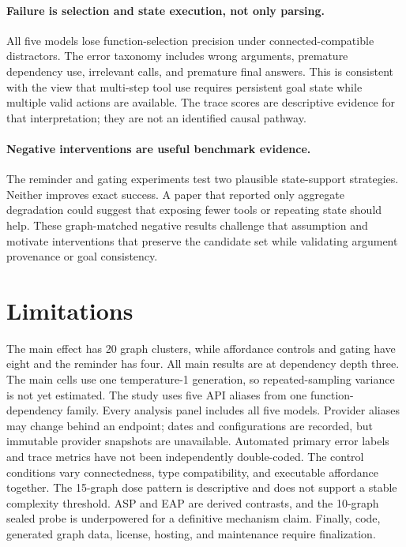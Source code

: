 \documentclass[twoside,11pt,preprint]{article}
\begin{document}
\paragraph{Failure is selection and state execution, not only parsing.}
All five models lose function-selection precision under connected-compatible
distractors. The error taxonomy includes wrong arguments, premature dependency
use, irrelevant calls, and premature final answers. This is consistent with the
view that multi-step tool use requires persistent goal state while multiple
valid actions are available. The trace scores are descriptive evidence for that
interpretation; they are not an identified causal pathway.

\paragraph{Negative interventions are useful benchmark evidence.}
The reminder and gating experiments test two plausible state-support strategies.
Neither improves exact success. A paper that reported only aggregate degradation
could suggest that exposing fewer tools or repeating state should help. These
graph-matched negative results challenge that assumption and motivate
interventions that preserve the candidate set while validating argument
provenance or goal consistency.

\section{Limitations}

The main effect has 20 graph clusters, while affordance controls and gating have
eight and the reminder has four. All main results are at dependency depth three.
The main cells use one temperature-1 generation, so repeated-sampling variance is
not yet estimated. The study uses five API aliases from one function-dependency
family. Every analysis panel includes all five models. Provider aliases may
change behind an endpoint; dates and configurations
are recorded, but immutable provider snapshots are unavailable. Automated
primary error labels and trace metrics have not been independently double-coded.
The control conditions vary connectedness, type compatibility, and executable
affordance together. The 15-graph dose pattern is descriptive and does not
support a stable complexity threshold. ASP and EAP are derived contrasts, and
the 10-graph sealed probe is underpowered for a definitive mechanism claim.
Finally, code, generated graph data,
license, hosting, and maintenance require finalization.
\end{document}
